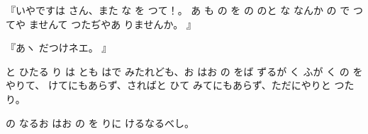 
『いやですは
さん、また
な
を
つて！。
あ
も
の
を
の
のと
な
なんか
の
で
つてや
ませんて
つたぢやあ
りませんか。
』

『あヽ
だつけネエ。
』

と
ひたる
り
は
とも
はで
みたれども、お
はお
の
をば
ずるが
く
ふが
く
の
を
やりて、
けてにもあらず、さればと
ひて
みてにもあらず、ただにやりと
つたり。

の
なるお
はお
の
を
りに
けるなるべし。

